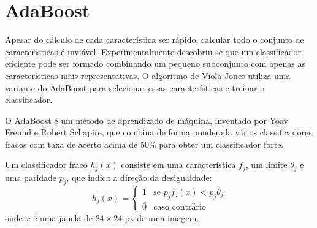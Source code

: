 \section{AdaBoost}

Apesar do cálculo de cada característica ser rápido, calcular todo o conjunto de características é inviável. Experimentalmente descobriu-se que um classificador eficiente pode ser formado combinando um pequeno subconjunto com apenas as características mais representativas. O algoritmo de Viola-Jones utiliza uma variante do AdaBoost para selecionar essas características e treinar o classificador.

O AdaBoost é um método de aprendizado de máquina, inventado por Yoav Freund e Robert Schapire\cite{freund1997decision}, que combina de forma ponderada vários classificadores fracos com taxa de acerto acima de 50\% para obter um classificador forte.

Um classificador fraco $h_{j}(x)$ consiste em uma característica $f_{j}$, um limite $\theta_{j}$ e uma paridade $p_{j}$, que indica a direção da desigualdade:
%
\begin{equation} \label{eq:weak_classifier}
    h_{j}(x) = 
    \begin{cases}
        1 & \text{se } p_{j}f_{j}(x) < p_{j}\theta_{j}\\
        0 & \text{caso contrário}
    \end{cases}
\end{equation}
%
onde $x$ é uma janela de $24\times24$ px de uma imagem.

